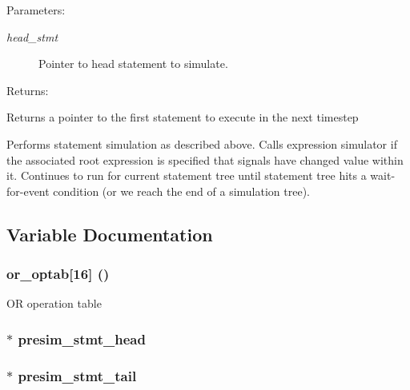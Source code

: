 \begin{Desc}
\item[Parameters: ]\par
\begin{description}
\item[{\em 
head\_\-stmt}]Pointer to head statement to simulate.\end{description}
\end{Desc}
\begin{Desc}
\item[Returns: ]\par
Returns a pointer to the first statement to execute in the next timestep\end{Desc}
Performs statement simulation as described above. Calls expression simulator if the associated root expression is specified that signals have changed value within it. Continues to run for current statement tree until statement tree hits a wait-for-event condition (or we reach the end of a simulation tree). 

\subsection{Variable Documentation}
\subsubsection{ or\_\-optab[16] ()}\label{sim_8c_a0}


OR operation table 
\subsubsection{$\ast$ presim\_\-stmt\_\-head}\label{sim_8c_a1}


\subsubsection{$\ast$ presim\_\-stmt\_\-tail}\label{sim_8c_a2}



